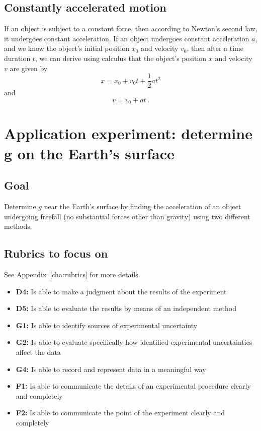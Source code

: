 \subsection{Constantly accelerated motion}

If an object is subject to a constant force, then according to Newton's second law, it undergoes constant acceleration. If an object undergoes constant acceleration $a$, and we know the object's initial position $x_0$ and velocity $v_0$, then after a time duration $t$, we can derive using calculus that the object's position $x$ and velocity $v$ are given by
\begin{equation}\label{lg:eq:x-const-a}
 x = x_0 + v_0 t + \frac{1}{2} a t^2
\end{equation}
and
\begin{equation}
 v = v_0 + a t \,.
\end{equation}

\section{Application experiment: determine $\bm{g}$ on the Earth's surface}

\subsection{Goal}

Determine $g$ near the Earth's surface by finding the acceleration of an object undergoing freefall (no substantial forces other than gravity) using two different methods.

\subsection{Rubrics to focus on}

See Appendix~\ref{cha:rubrics} for more details.

\begin{itemize}
	\item \textbf{D4:} Is able to make a judgment about the results of the experiment

	\item \textbf{D5:} Is able to evaluate the results by means of an independent method

	\item \textbf{G1:} Is able to identify sources of experimental uncertainty
	
	\item \textbf{G2:} Is able to evaluate specifically how identified experimental uncertainties affect the data
	
	\item \textbf{G4:} Is able to record and represent data in a meaningful way
	
	\item \textbf{F1:} Is able to communicate the details of an experimental procedure clearly and completely
	
	\item \textbf{F2:} Is able to communicate the point of the experiment clearly and completely
	
\end{itemize}


